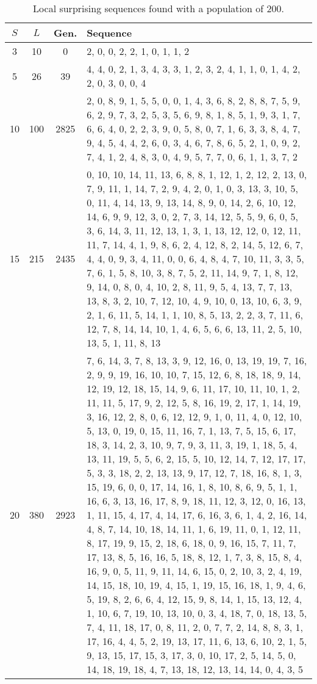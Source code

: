 \begin{table}
{\footnotesize
\begin{tabularx}{\textwidth}{cccX}
\toprule
$S$ & $L$ & Gen. & Sequence \\
\midrule
3   & 10  & 0   & 2, 0, 0, 2, 2, 1, 0, 1, 1, 2 \\
5   & 26  & 39  & 4, 4, 0, 2, 1, 3, 4, 3, 3, 1, 2, 3, 2, 4, 1, 1, 0, 1, 4, 2, 2, 0, 3, 0, 0, 4 \\
10  & 100 & 2825 & 2, 0, 8, 9, 1, 5, 5, 0, 0, 1, 4, 3, 6, 8, 2, 8, 8, 7, 5, 9, 6, 2, 9, 7, 3, 2, 5, 3, 5, 6, 9, 8, 1, 8, 5, 1, 9, 3, 1, 7, 6, 6, 4, 0, 2, 2, 3, 9, 0, 5, 8, 0, 7, 1, 6, 3, 3, 8, 4, 7, 9, 4, 5, 4, 4, 2, 6, 0, 3, 4, 6, 7, 8, 6, 5, 2, 1, 0, 9, 2, 7, 4, 1, 2, 4, 8, 3, 0, 4, 9, 5, 7, 7, 0, 6, 1, 1, 3, 7, 2 \\
15  & 215 & 2435 & 0, 10, 10, 14, 11, 13, 6, 8, 8, 1, 12, 1, 2, 12, 2, 13, 0, 7, 9, 11, 1, 14, 7, 2, 9, 4, 2, 0, 1, 0, 3, 13, 3, 10, 5, 0, 11, 4, 14, 13, 9, 13, 14, 8, 9, 0, 14, 2, 6, 10, 12, 14, 6, 9, 9, 12, 3, 0, 2, 7, 3, 14, 12, 5, 5, 9, 6, 0, 5, 3, 6, 14, 3, 11, 12, 13, 1, 3, 1, 13, 12, 12, 0, 12, 11, 11, 7, 14, 4, 1, 9, 8, 6, 2, 4, 12, 8, 2, 14, 5, 12, 6, 7, 4, 4, 0, 9, 3, 4, 11, 0, 0, 6, 4, 8, 4, 7, 10, 11, 3, 3, 5, 7, 6, 1, 5, 8, 10, 3, 8, 7, 5, 2, 11, 14, 9, 7, 1, 8, 12, 9, 14, 0, 8, 0, 4, 10, 2, 8, 11, 9, 5, 4, 13, 7, 7, 13, 13, 8, 3, 2, 10, 7, 12, 10, 4, 9, 10, 0, 13, 10, 6, 3, 9, 2, 1, 6, 11, 5, 14, 1, 1, 10, 8, 5, 13, 2, 2, 3, 7, 11, 6, 12, 7, 8, 14, 14, 10, 1, 4, 6, 5, 6, 6, 13, 11, 2, 5, 10, 13, 5, 1, 11, 8, 13 \\
20  & 380 & 2923 & 7, 6, 14, 3, 7, 8, 13, 3, 9, 12, 16, 0, 13, 19, 19, 7, 16, 2, 9, 9, 19, 16, 10, 10, 7, 15, 12, 6, 8, 18, 18, 9, 14, 12, 19, 12, 18, 15, 14, 9, 6, 11, 17, 10, 11, 10, 1, 2, 11, 11, 5, 17, 9, 2, 12, 5, 8, 16, 19, 2, 17, 1, 14, 19, 3, 16, 12, 2, 8, 0, 6, 12, 12, 9, 1, 0, 11, 4, 0, 12, 10, 5, 13, 0, 19, 0, 15, 11, 16, 7, 1, 13, 7, 5, 15, 6, 17, 18, 3, 14, 2, 3, 10, 9, 7, 9, 3, 11, 3, 19, 1, 18, 5, 4, 13, 11, 19, 5, 5, 6, 2, 15, 5, 10, 12, 14, 7, 12, 17, 17, 5, 3, 3, 18, 2, 2, 13, 13, 9, 17, 12, 7, 18, 16, 8, 1, 3, 15, 19, 6, 0, 0, 17, 14, 16, 1, 8, 10, 8, 6, 9, 5, 1, 1, 16, 6, 3, 13, 16, 17, 8, 9, 18, 11, 12, 3, 12, 0, 16, 13, 1, 11, 15, 4, 17, 4, 14, 17, 6, 16, 3, 6, 1, 4, 2, 16, 14, 4, 8, 7, 14, 10, 18, 14, 11, 1, 6, 19, 11, 0, 1, 12, 11, 8, 17, 19, 9, 15, 2, 18, 6, 18, 0, 9, 16, 15, 7, 11, 7, 17, 13, 8, 5, 16, 16, 5, 18, 8, 12, 1, 7, 3, 8, 15, 8, 4, 16, 9, 0, 5, 11, 9, 11, 14, 6, 15, 0, 2, 10, 3, 2, 4, 19, 14, 15, 18, 10, 19, 4, 15, 1, 19, 15, 16, 18, 1, 9, 4, 6, 5, 19, 8, 2, 6, 6, 4, 12, 15, 9, 8, 14, 1, 15, 13, 12, 4, 1, 10, 6, 7, 19, 10, 13, 10, 0, 3, 4, 18, 7, 0, 18, 13, 5, 7, 4, 11, 18, 17, 0, 8, 11, 2, 0, 7, 7, 2, 14, 8, 8, 3, 1, 17, 16, 4, 4, 5, 2, 19, 13, 17, 11, 6, 13, 6, 10, 2, 1, 5, 9, 13, 15, 17, 15, 3, 17, 3, 0, 10, 17, 2, 5, 14, 5, 0, 14, 18, 19, 18, 4, 7, 13, 18, 12, 13, 14, 14, 0, 4, 3, 5 \\
\bottomrule
\end{tabularx}
}
\caption{Local surprising sequences found with a population of 200.}
\label{table:local_surprising}
\end{table}

